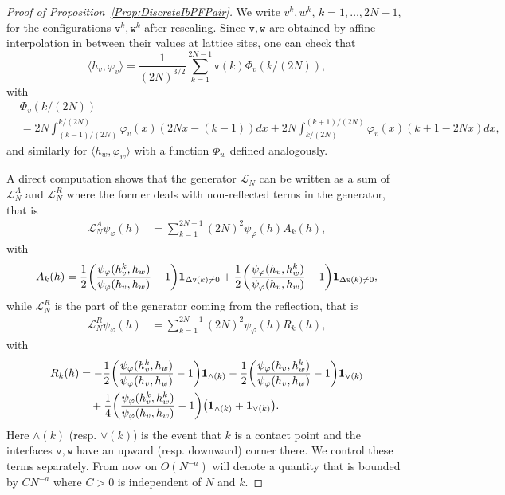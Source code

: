\documentclass[10pt]{amsart}
\theoremstyle{definition}\newtheorem{defi}[theo]{Definition}\newtheorem{rema}[theo]{Remark}\newtheorem{exam}[theo]{Example}\newtheorem{exem}[theo]{Example}\newtheorem{nota}[theo]{Notation}
\newcommand{\Wedge}{\wedge}\newcommand{\Vee}{\vee}
\theoremstyle{plain}
\newcommand{\tv}{\mathtt{v}}
\newcommand{\Tw}{\mathtt{w}}
\newcommand{\cL}{\mathcal{L}}
\let\originalleft\left
\let\originalright\right
\renewcommand{\left}{\mathopen{}\mathclose\bgroup\originalleft}
\renewcommand{\right}{\aftergroup\egroup\originalright}
\begin{document}
\begin{proof}[{Proof of Proposition~\ref{Prop:DiscreteIbPFPair}}]
We write $v^k,w^k$, $k=1,\dots,2N-1$, for the configurations $\tv^k,\Tw^k$ after rescaling. Since $\tv,\Tw$ are obtained by affine interpolation in between their values at lattice sites, one can check that
\[
\langle h_v,\varphi_v\rangle = \frac1{(2N)^{3/2}} \sum_{k=1}^{2N-1} \tv(k) \Phi_v(k/(2N)),
\]
with
\begin{align*}
&\Phi_v(k/(2N)) \\
&= 2N \int_{(k-1)/(2N)}^{k/(2N)} \varphi_v(x) (2Nx-(k-1)) dx + 2N \int_{k/(2N)}^{(k+1)/(2N)} \varphi_v(x) (k+1 - 2Nx) dx,
\end{align*}
and similarly for $\langle h_w,\varphi_w\rangle$ with a function $\Phi_w$ defined analogously.

A direct computation shows that the generator $\cL_N$ can be written as a sum of $ \cL_N^A$ and $ \cL_N^R$ where the former deals with non-reflected terms in the generator, that is
\begin{align*}
\cL_N^A \psi_\varphi(h) &= \sum_{k = 1}^{2N-1} {(2N)^2} \psi_\varphi(h)A_k(h),
\end{align*}
with
\[
A_k(h) = \frac12\left(\frac{\psi_\varphi(h_v^k,h_w)}{\psi_\varphi(h_v,h_w)} - 1 \right) \mathbf{1}_{\Delta \tv(k) \ne 0} + \frac12 \left(\frac{\psi_\varphi(h_v,h_w^k)}{\psi_\varphi(h_v,h_w)} - 1 \right) \mathbf{1}_{\Delta \Tw(k) \ne 0},
\]
while $ \cL_N^R$ is the part of the generator coming from the reflection, that is
\begin{align*}
\cL_N^R \psi_\varphi(h) &= \sum_{k = 1}^{2N-1} {(2N)^2}\psi_\varphi(h)R_k(h),
\end{align*}
with
\begin{align*}
R_k(h) &= -\frac12\left(\frac{\psi_\varphi(h_v^k,h_w)}{\psi_\varphi(h_v,h_w)} - 1 \right) \mathbf{1}_{\Wedge(k)}-\frac12\left(\frac{\psi_\varphi(h_v,h_w^k)}{\psi_\varphi(h_v,h_w)} - 1 \right) \mathbf{1}_{\Vee(k)} \\
&\quad + \frac14\left(\frac{\psi_\varphi(h_v^k,h_w^k)}{\psi_\varphi(h_v,h_w)} - 1 \right)\left(\mathbf{1}_{\Wedge(k)}+\mathbf{1}_{\Vee(k)}\right).
\end{align*}
Here $\Wedge(k)$ (resp. $\Vee(k)$) is the event that $k$ is a contact point and the interfaces $\tv, \Tw$ have an upward (resp. downward) corner there. We control these terms separately. From now on $O(N^{-a})$ will denote a quantity that is bounded by $CN^{-a}$ where $C>0$ is independent of $N$ and $k$.


\end{proof}
\end{document}
